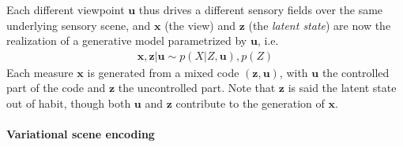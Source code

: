 \documentclass{article}
\begin{document}
Each different viewpoint $\boldsymbol{u}$ thus drives a different sensory fields over the same underlying sensory scene, and $\boldsymbol{x}$ (the view) and $\boldsymbol{z}$ (the \emph{latent state}) are now the realization of a generative model parametrized by $\boldsymbol{u}$, i.e.
\begin{align}
\boldsymbol{x}, \boldsymbol{z} | \boldsymbol{u} \sim p(X|Z, \boldsymbol{u}), p(Z)
\end{align}  
Each measure $\boldsymbol{x}$ is generated from a mixed code $(\boldsymbol{z}, \boldsymbol{u})$, with $\boldsymbol{u}$ the controlled part of the code and  $\boldsymbol{z}$ the uncontrolled part. %
Note that $\boldsymbol{z}$ is said the latent state out of habit, though both $\boldsymbol{u}$ and $\boldsymbol{z}$ contribute to the generation of $\boldsymbol{x}$.


\paragraph{Variational scene encoding}\label{sec:encoding}
\end{document}
